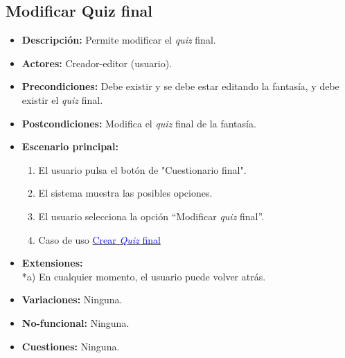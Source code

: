 \documentclass[12pt,letterpaper]{article}
\begin{document}
\subsection{Modificar Quiz final}
\begin{itemize}
	\item \textbf{Descripción:} Permite modificar el \textit{quiz} final.
	\item \textbf{Actores:} Creador-editor (usuario).
	\item \textbf{Precondiciones:} Debe existir y se debe estar editando la fantasía, y debe existir el \textit{quiz} final.
	\item \textbf{Postcondiciones:} Modifica el \textit{quiz} final de la fantasía.
	\item \textbf{Escenario principal:}
	\begin{enumerate}
		\item El usuario pulsa el botón de "Cuestionario final".
		\item El sistema muestra las posibles opciones.
		\item El usuario selecciona la opción ``Modificar \textit{quiz} final''.
		\item Caso de uso \hyperlink{crearquizfinal}{\textcolor{blue}{Crear \textit{Quiz} final}}
	\end{enumerate}
	\item \textbf{Extensiones:} \\ *a) En cualquier momento, el usuario puede volver atrás.
	\item \textbf{Variaciones:} Ninguna.
	\item \textbf{No-funcional:} Ninguna.
	\item \textbf{Cuestiones:} Ninguna.
\end{itemize}
\end{document}
